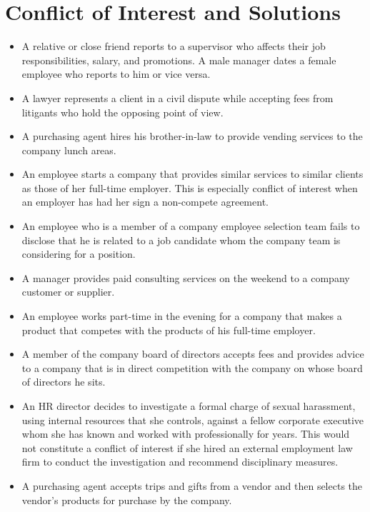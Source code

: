 \documentclass[12pt,a4paper,oneside]{article}
\begin{document}

\newpage
{}
\setcounter{page}{1}


\section{Conflict of Interest and Solutions}

\begin{itemize}
\item A relative or close friend reports to a supervisor who affects their job responsibilities, salary, and promotions.
A male manager dates a female employee who reports to him or vice versa.
\item A lawyer represents a client in a civil dispute while accepting fees from litigants who hold the opposing point of view.
\item A purchasing agent hires his brother-in-law to provide vending services to the company lunch areas.
\item An employee starts a company that provides similar services to similar clients as those of her full-time employer. This is especially conflict of interest when an employer has had her sign a non-compete agreement.
\item An employee who is a member of a company employee selection team fails to disclose that he is related to a job candidate whom the company team is considering for a position.
\item A manager provides paid consulting services on the weekend to a company customer or supplier.
\item An employee works part-time in the evening for a company that makes a product that competes with the products of his full-time employer.
\item A member of the company board of directors accepts fees and provides advice to a company that is in direct competition with the company on whose board of directors he sits.
\item An HR director decides to investigate a formal charge of sexual harassment, using internal resources that she controls, against a fellow corporate executive whom she has known and worked with professionally for years. This would not constitute a conflict of interest if she hired an external employment law firm to conduct the investigation and recommend disciplinary measures.
\item A purchasing agent accepts trips and gifts from a vendor and then selects the vendor's products for purchase by the company.

\end{itemize}
\end{document}
